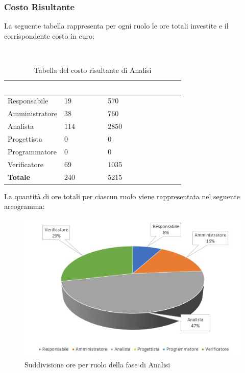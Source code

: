 \clearpage
\subsubsection{Costo Risultante}
La seguente tabella rappresenta per ogni ruolo le ore totali investite e il corrispondente costo in euro:
{
\renewcommand{\arraystretch}{2}
\centering
\
\begin{longtable}{ C{3cm} C{2cm} C{4cm}}
\caption{Tabella del costo risultante di Analisi}\\
	\textcolor{white}{\textbf{Ruolo}} & 
	\textcolor{white}{\textbf{Totale ore}} & 
	\textcolor{white}{\textbf{Costo ruolo in euro}}\\	
\endhead

        Responsabile & 19 & 570\\
        Amministratore & 38 & 760\\
        Analista & 114 & 2850 \\
        Progettista & 0 & 0 \\
        Programmatore & 0 & 0 \\
        Verificatore & 69 & 1035 \\
        \textbf{Totale} & 240 & 5215 \\
		
	\end{longtable}

}


La quantità di ore totali per ciascun ruolo viene rappresentata nel seguente areogramma:
\begin{figure}[h]
\centering	
	\includegraphics[scale=3.0]{Sezioni/Aerogrammi/AerogrammaAnalisi.png}
	\caption{Suddivisione ore per ruolo della fase di Analisi}
\end{figure}
\clearpage

